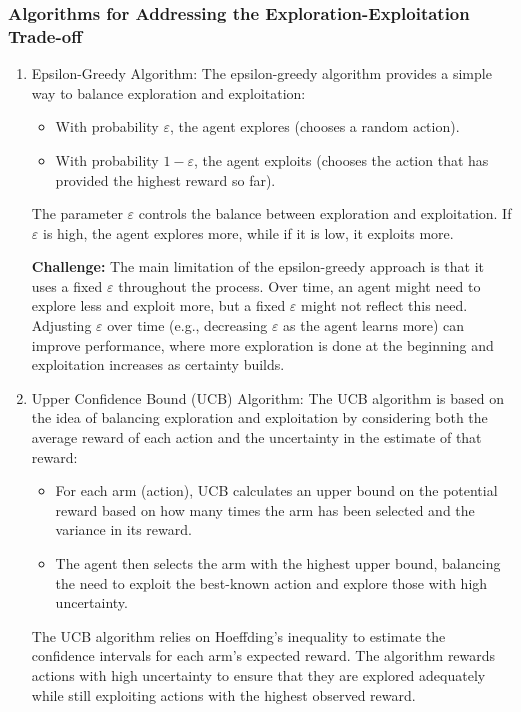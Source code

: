 \documentclass[11pt]{article}
\begin{document}
\subsubsection*{Algorithms for Addressing the Exploration-Exploitation Trade-off}
\begin{enumerate}[1.]
  \item Epsilon-Greedy Algorithm:
  The epsilon-greedy algorithm provides a simple way to balance exploration and exploitation:
  \begin{itemize}
    \item With probability $\varepsilon$, the agent explores (chooses a random action).
    \item With probability $1 - \varepsilon$, the agent exploits (chooses the action that has provided the highest reward so far).
  \end{itemize}
  The parameter $\varepsilon$ controls the balance between exploration and exploitation. If $\varepsilon$ is high, the agent explores more, while if it is low, it exploits more.

  \textbf{Challenge:} The main limitation of the epsilon-greedy approach is that it uses a fixed $\varepsilon$ throughout the process. Over time, an agent might need to explore less and exploit more, but a fixed $\varepsilon$ might not reflect this need. Adjusting $\varepsilon$ over time (e.g., decreasing $\varepsilon$ as the agent learns more) can improve performance, where more exploration is done at the beginning and exploitation increases as certainty builds.
  
  \item Upper Confidence Bound (UCB) Algorithm:
  The UCB algorithm is based on the idea of balancing exploration and exploitation by considering both the average reward of each action and the uncertainty in the estimate of that reward:
  \begin{itemize}
    \item For each arm (action), UCB calculates an upper bound on the potential reward based on how many times the arm has been selected and the variance in its reward.
    \item The agent then selects the arm with the highest upper bound, balancing the need to exploit the best-known action and explore those with high uncertainty.
  \end{itemize}
  The UCB algorithm relies on Hoeffding's inequality to estimate the confidence intervals for each arm's expected reward. The algorithm rewards actions with high uncertainty to ensure that they are explored adequately while still exploiting actions with the highest observed reward.
  

\end{enumerate}
\end{document}
